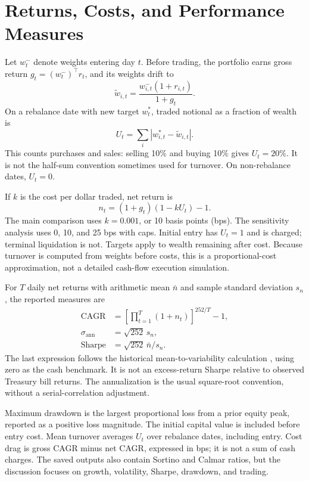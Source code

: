 \documentclass[conference]{IEEEtran}
\begin{document}
\section{Returns, Costs, and Performance Measures}
Let $w^-_t$ denote weights entering day $t$. Before trading, the portfolio earns gross return $g_t=(w^-_t)^\top r_t$, and its weights drift to
\begin{equation}
 \widetilde w_{i,t}=\frac{w^-_{i,t}(1+r_{i,t})}{1+g_t}.
\end{equation}
On a rebalance date with new target $w^*_t$, traded notional as a fraction of wealth is
\begin{equation}
 U_t=\sum_i\left|w^*_{i,t}-\widetilde w_{i,t}\right|.
\end{equation}
This counts purchases and sales: selling 10\% and buying 10\% gives $U_t=20\%$. It is not the half-sum convention sometimes used for turnover. On non-rebalance dates, $U_t=0$.

If $k$ is the cost per dollar traded, net return is
\begin{equation}
 n_t=(1+g_t)(1-kU_t)-1.
 \label{eq:net}
\end{equation}
The main comparison uses $k=0.001$, or 10 basis points (bps). The sensitivity analysis uses 0, 10, and 25 bps with caps. Initial entry has $U_t=1$ and is charged; terminal liquidation is not. Targets apply to wealth remaining after cost. Because turnover is computed from weights before costs, this is a proportional-cost approximation, not a detailed cash-flow execution simulation.

For $T$ daily net returns with arithmetic mean $\bar n$ and sample standard deviation $s_n$, the reported measures are
\begin{align}
 \mathrm{CAGR} &= \left[\prod_{t=1}^{T}(1+n_t)\right]^{252/T}-1,\\
 \sigma_{\mathrm{ann}} &= \sqrt{252}\,s_n,\\
 \mathrm{Sharpe} &= \sqrt{252}\,\bar n/s_n.
\end{align}
The last expression follows the historical mean-to-variability calculation \cite{sharpe}, using zero as the cash benchmark. It is not an excess-return Sharpe relative to observed Treasury bill returns. The annualization is the usual square-root convention, without a serial-correlation adjustment.

Maximum drawdown is the largest proportional loss from a prior equity peak, reported as a positive loss magnitude. The initial capital value is included before entry cost. Mean turnover averages $U_t$ over rebalance dates, including entry. Cost drag is gross CAGR minus net CAGR, expressed in bps; it is not a sum of cash charges. The saved outputs also contain Sortino and Calmar ratios, but the discussion focuses on growth, volatility, Sharpe, drawdown, and trading.
\end{document}
